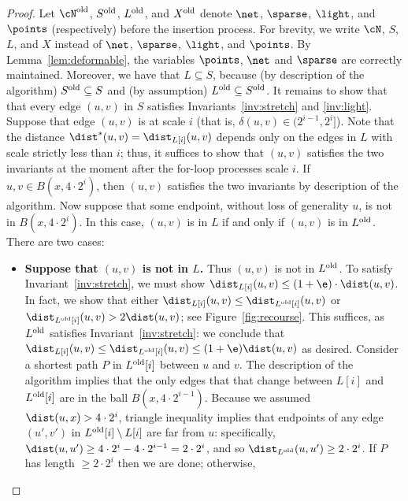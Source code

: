 \begin{proof}
Let $\cN^{\rm old}$, $S^{\rm old}$, $L^{\rm old}$, and $X^{\rm old}$ denote $\net$, $\sparse$, $\light$, and $\points$ (respectively) before the insertion process.
For brevity, we write $\cN$, $S$, $L$, and $X$ instead of $\net$, $\sparse$, $\light$, and $\points$.
By Lemma~\ref{lem:deformable}, the variables $\points$, $\net$ and $\sparse$ are correctly maintained.
% 
Moreover, we have that $L \subseteq S$, because (by description of the algorithm) $S^{\rm old} \subseteq S$ and (by assumption) $L^{\rm old} \subseteq S^{\rm old}$.
%
%
    It remains to show that that every edge $(u,v)$ in $S$ satisfies Invariants~\ref{inv:stretch} and \ref{inv:light}.
    Suppose that edge $(u,v)$ is at scale $i$ (that is, $\delta(u,v)\in (2^{i-1},2^{i}]$).
    Note that the distance $\dist^*(u,v) = \dist_{L[i]}(u,v)$ 
    depends only on the edges in $L$ with scale strictly less than $i$; thus, it suffices to show that $(u,v)$ satisfies the two invariants at the moment after the for-loop processes scale $i$.
    If $u,v \in B(x, 4 \cdot 2^i)$, then $(u,v)$ satisfies the two invariants by description of the algorithm. Now suppose that some endpoint, without loss of generality $u$, is not in $B(x, 4 \cdot 2^i)$. In this case, $(u,v)$ is in $L$ if and only if $(u,v)$ is in $L^{\rm old}$. There are two cases:
    \begin{itemize}
        \item \textbf{\boldmath Suppose that $(u,v)$ is not in $L$.} Thus $(u,v)$ is not in $L^{\rm old}$. To satisfy Invariant~\ref{inv:stretch}, we must show $\dist_{L[i]}(u,v) \le (1+\e) \cdot \dist(u,v)$. In fact, we show that either $\dist_{L[i]}(u,v) \le \dist_{L^{\rm old}[i]}(u,v)$ or $\dist_{L^{\rm old}[i]}(u,v) > 2 \dist(u,v)$; see Figure~\ref{fig:recourse}. This suffices, as $L^{\rm old}$ satisfies Invariant~\ref{inv:stretch}: we conclude that $\dist_{L[i]}(u,v) \le \dist_{L^{\rm old}[i]}(u,v) \le (1+\e) \dist(u,v)$ as desired. Consider a shortest path $P$ in $L^{\rm old}[i]$ between $u$ and $v$. 
        The description of the algorithm implies that the only edges that that change between $L[i]$ and $L^{\rm old}[i]$ are in the ball $B(x, 4 \cdot 2^{i-1})$. Because we assumed $\dist(u,x) > 4 \cdot 2^i$, triangle inequality implies that endpoints of any edge $(u',v')$ in $L^{\rm old}[i] \setminus L[i]$ are far from $u$: specifically, $\dist(u,u') \ge 4 \cdot 2^i - 4 \cdot 2^{i-1} = 2 \cdot 2^i$, and so $\dist_{L^{\rm old}}(u,u') \ge 2 \cdot 2^i$.
        If $P$ has length $\ge 2 \cdot 2^i$ then we are done; otherwise,

\end{itemize}
\end{proof}

